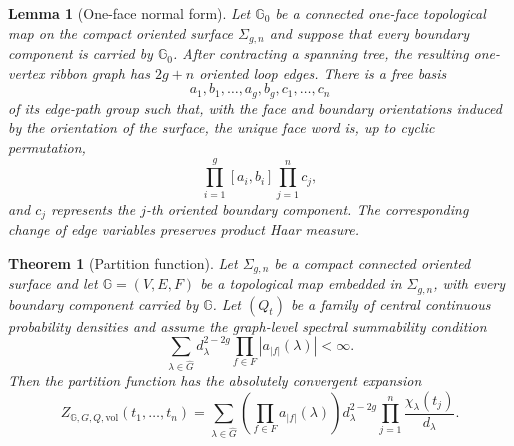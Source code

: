 \documentclass[10pt,a4paper]{amsart}
\newtheorem{theorem}{Theorem}
\newtheorem{lemma}{Lemma}
\newcommand\Gbb{{\mathbb{G}}}
\newcommand\vol{\mathrm{vol}}
\begin{document}
\begin{lemma}[One-face normal form]\label{lem:one-face-normal-form}
Let $\mathbb G_0$ be a connected one-face topological map on the compact
oriented surface $\Sigma_{g,n}$ and suppose that every boundary component is
carried by $\mathbb G_0$. After contracting a spanning tree, the resulting
one-vertex ribbon graph has $2g+n$ oriented loop edges. There is a free basis
\[
 a_1,b_1,\ldots,a_g,b_g,c_1,\ldots,c_n
\]
of its edge-path group such that, with the face and boundary orientations induced by the orientation of the surface, the unique face word is, up to cyclic
permutation,
\[
 \prod_{i=1}^g[a_i,b_i]\prod_{j=1}^n c_j,
\]
and $c_j$ represents the $j$-th oriented boundary component. The
corresponding change of edge variables preserves product Haar measure.
\end{lemma}

\begin{theorem}[Partition function]\label{thm:Fourier_PF}
Let $\Sigma_{g,n}$ be a compact connected oriented surface and let $\Gbb=(V,E,F)$ be a topological map embedded in $\Sigma_{g,n}$, with every boundary component carried by $\Gbb$. Let $(Q_t)$ be a family of central continuous probability densities and assume the graph-level spectral summability condition
\begin{equation}\label{eq:PF-spectral-summability}
 \sum_{\lambda\in\widehat G}
 d_\lambda^{2-2g}
 \prod_{f\in F}|a_{|f|}(\lambda)|<\infty.
\end{equation}
Then the partition function has the absolutely convergent expansion
\begin{equation}\label{eq:pf-state-sum-intro}
 Z_{\Gbb,G,Q,\vol}(t_1,\ldots,t_n)
 =\sum_{\lambda\in\widehat G}
 \left(\prod_{f\in F}a_{|f|}(\lambda)\right)
 d_\lambda^{2-2g}\prod_{j=1}^n\frac{\chi_\lambda(t_j)}{d_\lambda}.
\end{equation}
\end{theorem}
\end{document}
